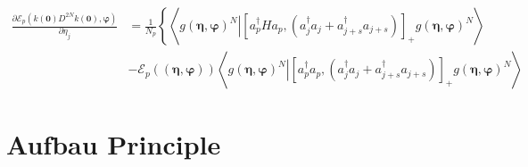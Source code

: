 \documentclass[aps,preprint]{revtex4}%
\begin{document}
\begin{align}
\frac{\partial\mathcal{E}_{p}\left(  k\left(  \mathbf{0}\right)
D^{2N}k\left(  \mathbf{0}\right)  ,\mathbf{\varphi}\right)  }{\partial\eta
_{j}}  &  =\frac{1}{N_{p}}\left\{  \left\langle \left.  g\left(  \mathbf{\eta
},\mathbf{\varphi}\right)  ^{N}\right\vert \left[  a_{p}^{\dagger}%
Ha_{p},\left(  a_{j}^{\dagger}a_{j}+a_{j+s}^{\dagger}a_{j+s}\right)  \right]
_{+}g\left(  \mathbf{\eta},\mathbf{\varphi}\right)  ^{N}\right\rangle \right.
\\
&  -\mathcal{E}_{p}\left(  \left(  \mathbf{\eta},\mathbf{\varphi}\right)
\right)  \left\langle \left.  g\left(  \mathbf{\eta},\mathbf{\varphi}\right)
^{N}\right\vert \left[  a_{p}^{\dagger}a_{p},\left(  a_{j}^{\dagger}%
a_{j}+a_{j+s}^{\dagger}a_{j+s}\right)  \right]  _{+}g\left(  \mathbf{\eta
},\mathbf{\varphi}\right)  ^{N}\right\rangle
\end{align}


\section{Aufbau Principle\label{aufbau}}
\end{document}
